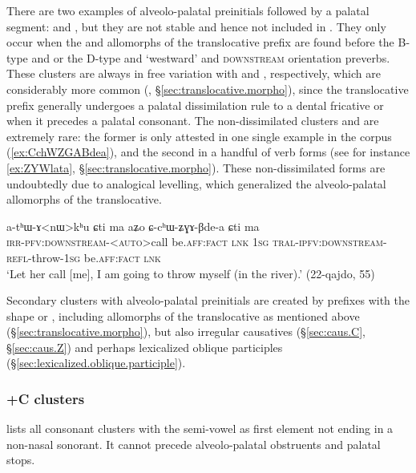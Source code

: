 There are two examples of alveolo-palatal preinitials followed by a palatal segment:  and , but they are not stable and hence not included in . They only occur when the  and  allomorphs of the translocative prefix are found before the B-type  and  or the D-type  and  `westward' and \textsc{downstream} orientation preverbs. These clusters are always in free variation with  and , respectively, which are considerably more common (, §\ref{sec:translocative.morpho}), since the translocative prefix generally undergoes a palatal dissimilation rule to a dental fricative  or  when it precedes a palatal consonant. The non-dissimilated clusters  and  are extremely rare: the former is only attested in one single example in the corpus (\ref{ex:CchWZGABdea}), and the second in a handful of verb forms (see for instance \ref{ex:ZYWlata}, §\ref{sec:translocative.morpho}). These non-dissimilated forms are undoubtedly due to analogical levelling, which generalized the alveolo-palatal allomorphs of the translocative.

\begin{exe}
	\ex \label{ex:CchWZGABdea}
	\gll a-tʰɯ-ɤ<nɯ>kʰu ɕti ma aʑo ɕ-cʰɯ-ʑɣɤ-βde-a ɕti ma \\
	\textsc{irr}-\textsc{pfv}:\textsc{downstream}-<\textsc{auto}>call be.\textsc{aff}:\textsc{fact} \textsc{lnk} \textsc{1sg} \textsc{tral}-\textsc{ipfv}:\textsc{downstream}-\textsc{refl}-throw-\textsc{1sg} be.\textsc{aff}:\textsc{fact} \textsc{lnk} \\
	\glt `Let her call [me], I am going to throw myself (in the river).' (22-qajdo, 55)
\end{exe}

Secondary clusters with alveolo-palatal preinitials are created by prefixes with the shape  or , including allomorphs of the translocative as mentioned above (§\ref{sec:translocative.morpho}), but also irregular causatives (§\ref{sec:caus.C}, §\ref{sec:caus.Z}) and perhaps lexicalized oblique participles (§\ref{sec:lexicalized.oblique.participle}).

\subsubsection{+C clusters}  \label{sec:jC.clusters}
  lists all consonant clusters with the semi-vowel  as first element not ending in a non-nasal sonorant. It cannot precede alveolo-palatal obstruents and palatal stops.

